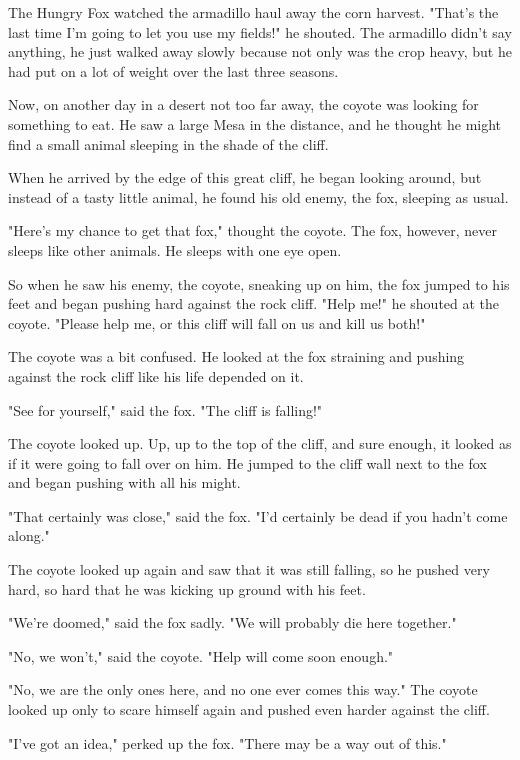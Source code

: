The Hungry Fox watched the armadillo haul away the corn harvest. "That's the last time I'm going to let you use my fields!" he shouted. The armadillo didn't say anything, he just walked away slowly because not only was the crop heavy, but he had put on a lot of weight over the last three seasons.

Now, on another day in a desert not too far away, the coyote was looking for something to eat. He saw a large Mesa in the distance, and he thought he might find a small animal sleeping in the shade of the cliff.

When he arrived by the edge of this great cliff, he began looking around, but instead of a tasty little animal, he found his old enemy, the fox, sleeping as usual.

"Here's my chance to get that fox," thought the coyote. The fox, however, never sleeps like other animals. He sleeps with one eye open.

So when he saw his enemy, the coyote, sneaking up on him, the fox jumped to his feet and began pushing hard against the rock cliff. "Help me!" he shouted at the coyote. "Please help me, or this cliff will fall on us and kill us both!"

The coyote was a bit confused. He looked at the fox straining and pushing against the rock cliff like his life depended on it.

"See for yourself," said the fox. "The cliff is falling!"

The coyote looked up. Up, up to the top of the cliff, and sure enough, it looked as if it were going to fall over on him. He jumped to the cliff wall next to the fox and began pushing with all his might.

"That certainly was close," said the fox. "I'd certainly be dead if you hadn't come along."

The coyote looked up again and saw that it was still falling, so he pushed very hard, so hard that he was kicking up ground with his feet.

"We're doomed," said the fox sadly. "We will probably die here together."

"No, we won't," said the coyote. "Help will come soon enough."

"No, we are the only ones here, and no one ever comes this way." The coyote looked up only to scare himself again and pushed even harder against the cliff.

"I've got an idea," perked up the fox. "There may be a way out of this."

